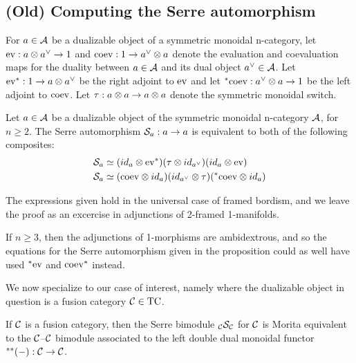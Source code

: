\documentclass{amsart}
\begin{document}
\subsection{(Old) Computing the Serre automorphism} \label{sec-serre-comp}


For $a \in \mathcal A$ be a dualizable object of a symmetric monoidal n-category, let $\mathrm{ev} : a \otimes a^{\vee} \rightarrow 1$ and $\mathrm{coev}: 1 \rightarrow a^{\vee} \otimes a$ denote the evaluation and coevaluation maps for the duality between $a \in \mathcal A$ and its dual object $a^{\vee} \in \mathcal A$.  Let ${\mathrm{ev}}^*: 1 \rightarrow a \otimes a^{\vee}$ be the right adjoint to $\mathrm{ev}$ and let ${}^*{\mathrm{coev}}: a^{\vee} \otimes a \rightarrow 1$ be the left adjoint to $\mathrm{coev}$.  Let $\tau: a \otimes a \rightarrow a \otimes a$ denote the symmetric monoidal switch.

\begin{proposition} \label{prop-serrecomp}
Let $a \in \mathcal A$ be a dualizable object of the symmetric monoidal n-category $\mathcal A$, for $n \geq 2$.  The Serre automorphism $\mathcal S_a : a \rightarrow a$ is equivalent to both of the following composites:
\begin{align}
\mathcal S_a & \simeq ({id}_a \otimes {\mathrm{ev}}^*) (\tau \otimes {id}_{a^{\vee}}) ({id}_a \otimes \mathrm{ev}) \nonumber\\
\mathcal S_a & \simeq (\mathrm{coev} \otimes {id}_a) ({id}_{a^{\vee}} \otimes \tau) ({}^*{\mathrm{coev}} \otimes {id}_a) \nonumber
\end{align}
\end{proposition}

The expressions given hold in the universal case of framed bordism, and we leave the proof as an excercise in adjunctions of 2-framed 1-manifolds.

\begin{remark}
If $n \geq 3$, then the adjunctions of 1-morphisms are ambidextrous, and so the equations for the Serre automorphism given in the proposition could as well have used ${}^*{\mathrm{ev}}$ and ${\mathrm{coev}}^*$ instead.
\end{remark}


We now specialize to our case of interest, namely where the dualizable object in question is a fusion category $\mathcal C \in \mathrm{TC}$.


\begin{theorem} \label{thm-serre}
If $\mathcal C$ is a fusion category, then the Serre bimodule ${}_{\mathcal C} {\mathcal S}_{\mathcal C}$ for $\mathcal C$ is Morita equivalent to the $\mathcal C$--$\mathcal C$ bimodule associated to the left double dual monoidal functor ${}^{**}{(-)}: \mathcal C \rightarrow \mathcal C$.
\end{theorem}
\end{document}
